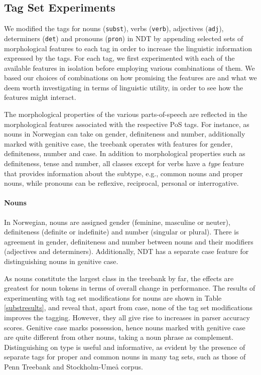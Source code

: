 \documentclass[11pt,a4paper]{article}
\begin{document}
\subsection{Tag Set Experiments}
We modified the tags for nouns (\texttt{subst}), verbs (\texttt{verb}),
adjectives (\texttt{adj}), determiners (\texttt{det}) and pronouns
(\texttt{pron}) in NDT by appending selected sets of morphological features to
each tag in order to increase the linguistic information expressed by the tags.
For each tag, we first experimented with each of the available features in
isolation before employing various combinations of them. We based our choices
of combinations on how promising the features are and what we deem worth
investigating in terms of linguistic utility, in order to see how the features
might interact.

The morphological properties of the various parts-of-speech are reflected in
the morphological features associated with the respective PoS tags. For
instance, as nouns in Norwegian can take on gender, definiteness and number,
additionally marked with genitive case, the treebank operates with features for
gender, definiteness, number and case.
In addition to morphological properties such as definiteness, tense and number,
all classes except for verbs have a \emph{type} feature that provides
information about the subtype, e.g., common nouns and proper nouns, while
pronouns can be reflexive, reciprocal, personal or interrogative.


\paragraph{Nouns}
In Norwegian, nouns are assigned gender (feminine, masculine or neuter),
definiteness (definite or indefinite) and number (singular or plural). There
is agreement in gender, definiteness and number between nouns and their
modifiers (adjectives and determiners). Additionally, NDT has a separate case
feature for distinguishing nouns in genitive case.

As nouns constitute the largest class in the treebank by far, the effects are
greatest for noun tokens in terms of overall change in performance. The results
of experimenting with tag set modifications for nouns are shown in Table
\ref{substresults}, and reveal that, apart from case, none of the tag set
modifications improves the tagging. However, they all give rise to increases in
parser accuracy scores. Genitive case marks possession, hence nouns marked with
genitive case are quite different from other nouns, taking a noun phrase as
complement. Distinguishing on type is useful and informative, as evident by the
presence of separate tags for proper and common nouns in many tag sets, such as
those of Penn Treebank and Stockholm-Umeå corpus.
\end{document}
